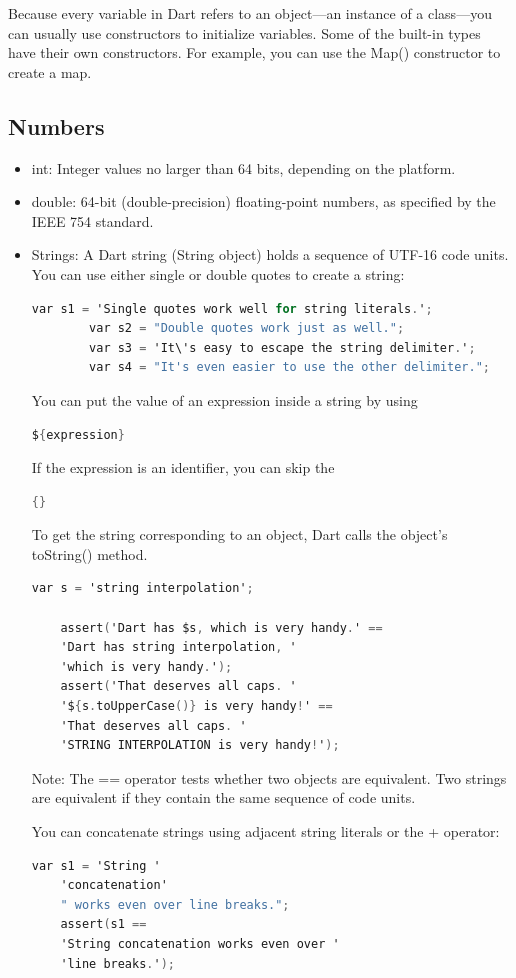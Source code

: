 Because every variable in Dart refers to an object—an instance of a class—you can usually use constructors to initialize variables. Some of the built-in types have their own constructors. For example, you can use the Map() constructor to create a map.
\subsection{Numbers}
\begin{itemize}
	\item int: Integer values no larger than 64 bits, depending on the platform.
	\item double: 64-bit (double-precision) floating-point numbers, as specified by the IEEE 754 standard.
	\item Strings: A Dart string (String object) holds a sequence of UTF-16 code units. You can use either single or double quotes to create a string:
	\begin{lstlisting}[language=C]
		var s1 = 'Single quotes work well for string literals.';
		var s2 = "Double quotes work just as well.";
		var s3 = 'It\'s easy to escape the string delimiter.';
		var s4 = "It's even easier to use the other delimiter.";
	\end{lstlisting}
You can put the value of an expression inside a string by using 
\begin{lstlisting}[language=C]
	${expression}
\end{lstlisting}

If the expression is an identifier, you can skip the 
\begin{lstlisting}[language=C]
	{}
\end{lstlisting}
To get the string corresponding to an object, Dart calls the object's toString() method.

\begin{lstlisting}[language=C]
	var s = 'string interpolation';
	
	assert('Dart has $s, which is very handy.' ==
	'Dart has string interpolation, '
	'which is very handy.');
	assert('That deserves all caps. '
	'${s.toUpperCase()} is very handy!' ==
	'That deserves all caps. '
	'STRING INTERPOLATION is very handy!');
\end{lstlisting}
 Note: The == operator tests whether two objects are equivalent. Two strings are equivalent if they contain the same sequence of code units.
 
 You can concatenate strings using adjacent string literals or the + operator:
 \begin{lstlisting}[language=C]
 	var s1 = 'String '
 	'concatenation'
 	" works even over line breaks.";
 	assert(s1 ==
 	'String concatenation works even over '
 	'line breaks.');
 	

\end{lstlisting}
\end{itemize}

